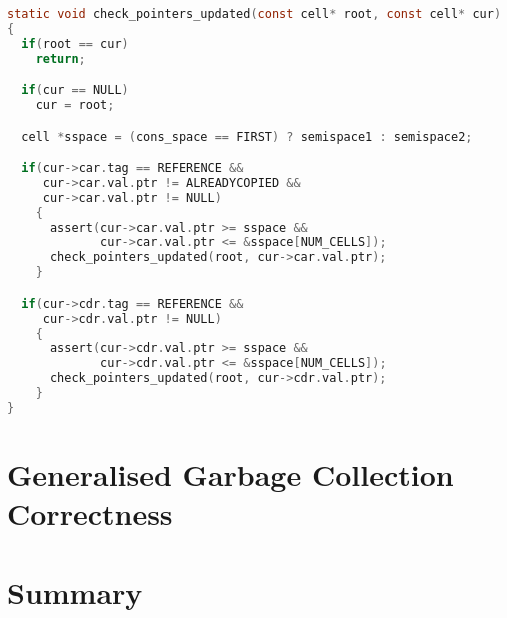 \begin{lstlisting}[language=C,caption={Fenichel/Yochelson Pointer Checking}]
static void check_pointers_updated(const cell* root, const cell* cur)
{
  if(root == cur)
    return;

  if(cur == NULL)
    cur = root;

  cell *sspace = (cons_space == FIRST) ? semispace1 : semispace2;

  if(cur->car.tag == REFERENCE &&
     cur->car.val.ptr != ALREADYCOPIED &&
     cur->car.val.ptr != NULL)
    {
      assert(cur->car.val.ptr >= sspace &&
             cur->car.val.ptr <= &sspace[NUM_CELLS]);
      check_pointers_updated(root, cur->car.val.ptr);
    }

  if(cur->cdr.tag == REFERENCE &&
     cur->cdr.val.ptr != NULL)
    {
      assert(cur->cdr.val.ptr >= sspace &&
             cur->cdr.val.ptr <= &sspace[NUM_CELLS]);
      check_pointers_updated(root, cur->cdr.val.ptr);
    }
}
\end{lstlisting}

\section{Generalised Garbage Collection Correctness}
\label{sec:results-correctness}


\section{Summary}
\label{sec:results-summary}

